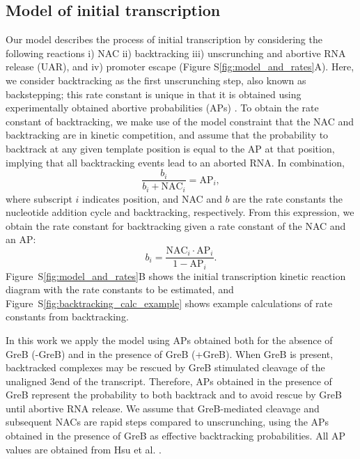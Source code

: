 %
\subsection{Model of initial transcription}
Our model describes the process of initial transcription by considering the
following reactions i) NAC ii) backtracking iii) unscrunching and abortive
RNA release (UAR), and iv) promoter escape (Figure
S\ref{fig:model_and_rates}A). Here, we consider backtracking as the first
unscrunching step, also known as backstepping; this rate constant is unique in
that it is obtained using experimentally obtained abortive probabilities
(APs) \cite{hsu_quantitative_1996}. To obtain the rate constant of
backtracking, we make use of the model constraint that the NAC and
backtracking are in kinetic competition, and assume that the probability to
backtrack at any given template position is equal to the AP at that
position, implying that all backtracking events lead to an aborted RNA. In
combination,
\begin{equation*}
    \frac{b_i}{b_i + \text{NAC}_i} = \text{AP}_i,
\end{equation*}
where subscript $i$ indicates position, and NAC and $b$ are the rate constants
the nucleotide addition cycle and backtracking, respectively. From this
expression, we obtain the rate constant for backtracking given a rate constant
of the NAC and an AP:
\begin{equation}
  b_i = \frac{\text{NAC}_i\cdot\text{AP}_i}{1-\text{AP}_i}.
  \label{eq:backtrackingcalc}
\end{equation}
Figure~S\ref{fig:model_and_rates}B shows the initial transcription kinetic
reaction diagram with the rate constants to be estimated, and
Figure~S\ref{fig:backtracking_calc_example} shows example calculations of rate
constants from backtracking.

In this work we apply the model using APs obtained both for the absence of
GreB (-GreB) and in the presence of GreB (+GreB). When GreB is present,
backtracked complexes may be rescued by GreB stimulated cleavage of the
unaligned 3\ppp end of the transcript. Therefore, APs obtained in the presence
of GreB represent the probability to both backtrack and to avoid rescue by
GreB until abortive RNA release. We assume that GreB-mediated cleavage and
subsequent NACs are rapid steps compared to unscrunching, using the APs
obtained in the presence of GreB as effective backtracking probabilities. All
AP values are obtained from Hsu et al. \cite{hsu_initial_2006}.

